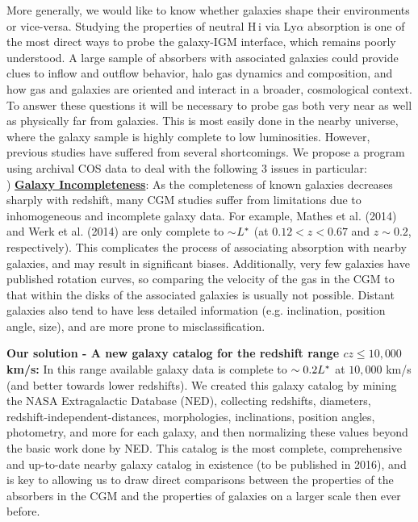 \documentclass[12pt]{article}
\begin{document}

More generally, we would like to know whether galaxies shape their environments or vice-versa. Studying the properties of neutral H\,{\sc i} via Ly$\alpha$ absorption is one of the most direct ways to probe the galaxy-IGM interface, which remains poorly understood. A large sample of absorbers with associated galaxies could provide clues to inflow and outflow behavior, halo gas dynamics and composition, and how gas and galaxies are oriented and interact in a broader, cosmological context. To answer these questions it will be necessary to probe gas both very near as well as physically far from galaxies. This is most easily done in the nearby universe, where the galaxy sample is highly complete to low luminosities. However, previous studies have suffered from several shortcomings. We propose a program using archival COS data to deal with the following 3 issues in particular:\\



) \textbf{\underline{Galaxy Incompleteness}}: As the completeness of known galaxies decreases sharply with redshift, many CGM studies suffer from limitations due to inhomogeneous and incomplete galaxy data. For example, Mathes et al. (2014) and Werk et al. (2014) are only complete to $\sim$$L^{\**}$ (at $0.12<z<0.67$ and $z\sim$$0.2$, respectively). This complicates the process of associating absorption with nearby galaxies, and may result in significant biases. Additionally, very few galaxies have published rotation curves, so comparing the velocity of the gas in the CGM to that within the disks of the associated galaxies is usually not possible. Distant galaxies also tend to have less detailed information (e.g. inclination, position angle, size), and are more prone to misclassification.

\textbf{Our solution - A new galaxy catalog for the redshift range $cz \leq 10,000$ km/s:} In this range available galaxy data is complete to $\sim0.2 L^{\**}$ at $10,000$ km/s (and better towards lower redshifts). We created this galaxy catalog by mining the NASA Extragalactic Database (NED), collecting redshifts, diameters, redshift-independent-distances, morphologies, inclinations, position angles, photometry, and more for each galaxy, and then normalizing these values beyond the basic work done by NED. This catalog is the most complete, comprehensive and up-to-date nearby galaxy catalog in existence (to be published in 2016), and is key to allowing us to draw direct comparisons between the properties of the absorbers in the CGM and the properties of galaxies on a larger scale then ever before.\\
\end{document}
